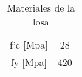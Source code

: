 \begin{table}[H]
  \centering
    \begin{tabular}{|c|c|}
    \rowcolor[rgb]{ .2,  .247,  .31} \multicolumn{2}{|c}{\textcolor[rgb]{ 1,  1,  1}{Características de materiales}} \bigstrut[b]\\
    \hline
    f'c [Mpa] & 28 \bigstrut\\
    \hline
    fy [Mpa] & 420 \bigstrut\\
    \hline
    \end{tabular}%
  \caption{Materiales de la losa}
  \label{tab:Mat losa}%
\end{table}%
